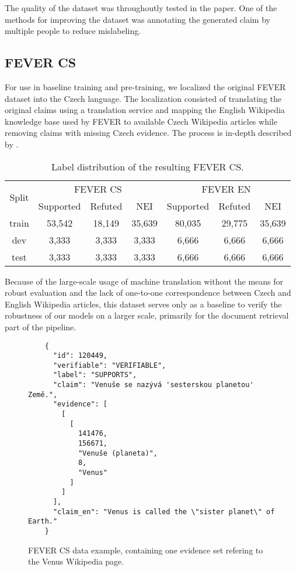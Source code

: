 The quality of the dataset was throughoutly tested in the paper.
One of the methods for improving the dataset was annotating the generated claim by multiple people to reduce mislabeling.

\subsection{FEVER CS}

For use in baseline training and pre-training, we localized the original FEVER dataset into the Czech language. 
The localization consisted of translating the original claims using a translation service and mapping the English Wikipedia knowledge base used by FEVER to available Czech Wikipedia articles while removing claims with missing Czech evidence.
The process is in-depth described by \citet[Chapter 3]{ullrich}.

\begin{table}[h!]
    \centering
    \begin{tabular}{c || c c c || c c c}
        \multirow{2}{0.8cm}{Split} & \multicolumn{3}{c||}{FEVER CS} & \multicolumn{3}{c}{FEVER EN} \\
        & Supported & Refuted & NEI & Supported & Refuted & NEI\\
        \hline
        train & 53,542 & 18,149 & 35,639 & 80,035 & 29,775 & 35,639\\
        dev & 3,333 & 3,333 & 3,333 & 6,666 & 6,666 & 6,666 \\
        test & 3,333 & 3,333 & 3,333 & 6,666 & 6,666 & 6,666
    \end{tabular}
\caption{Label distribution of the resulting FEVER CS.}
\end{table}

Because of the large-scale usage of machine translation without the means for robust evaluation and the lack of one-to-one correspondence between Czech and English Wikipedia articles, this dataset serves only as a baseline to verify the robustness of our models on a larger scale, primarily for the document retrieval part of the pipeline.

\begin{figure}[h!]
    \begin{framed}
    \begin{verbatim}
    {
      "id": 120449,
      "verifiable": "VERIFIABLE",
      "label": "SUPPORTS",
      "claim": "Venuše se nazývá 'sesterskou planetou' Země.",
      "evidence": [
        [
          [
            141476,
            156671,
            "Venuše (planeta)",
            8,
            "Venus"
          ]
        ]
      ],
      "claim_en": "Venus is called the \"sister planet\" of Earth."
    }\end{verbatim}
    \vspace{-0.4cm}
    \end{framed}
    \caption{FEVER CS data example, containing one evidence set refering to the Venus Wikipedia page.}
    \label{fig:fevercs_example}
\end{figure}

